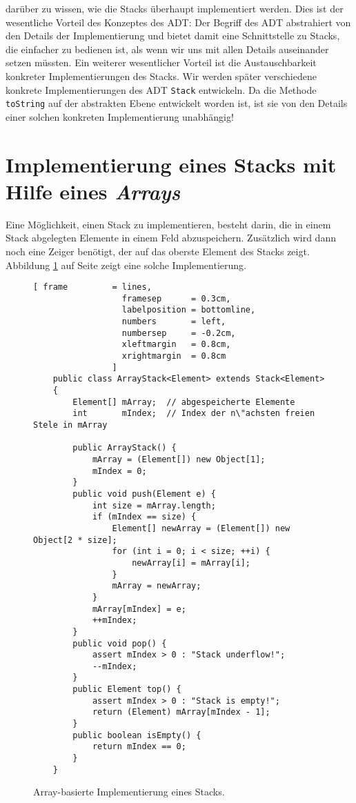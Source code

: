 dar\"uber zu wissen, wie die Stacks \"uberhaupt implementiert werden.  Dies ist der
wesentliche Vorteil des Konzeptes des ADT: Der Begriff des ADT abstrahiert von den Details der
Implementierung und bietet damit eine Schnittstelle zu Stacks, die einfacher zu bedienen
ist, als wenn wir uns mit allen Details auseinander setzen m\"ussten.  Ein weiterer
wesentlicher Vorteil ist die Austauschbarkeit konkreter Implementierungen des Stacks.  
Wir werden sp\"ater verschiedene konkrete
Implementierungen des ADT \texttt{Stack} entwickeln.  Da die Methode \texttt{toString} auf
der abstrakten Ebene entwickelt worden ist, ist sie von den Details einer solchen konkreten
Implementierung unabh\"angig!


\section{Implementierung eines Stacks mit Hilfe eines \emph{Arrays}}
Eine M\"oglichkeit, einen Stack zu implementieren, besteht darin,
die in einem Stack abgelegten Elemente in einem Feld abzuspeichern. 
Zus\"atzlich wird dann noch eine Zeiger ben\"otigt, der auf das oberste Element des Stacks 
zeigt. 
Abbildung \ref{fig:ArrayStack.java} auf Seite \pageref{fig:ArrayStack.java} zeigt eine solche
 Implementierung.

\begin{figure}[!h]
  \centering
\begin{Verbatim}[ frame         = lines, 
                  framesep      = 0.3cm, 
                  labelposition = bottomline,
                  numbers       = left,
                  numbersep     = -0.2cm,
                  xleftmargin   = 0.8cm,
                  xrightmargin  = 0.8cm
                ]
    public class ArrayStack<Element> extends Stack<Element>
    {
        Element[] mArray;  // abgespeicherte Elemente
        int       mIndex;  // Index der n\"achsten freien Stele in mArray
    
        public ArrayStack() {
            mArray = (Element[]) new Object[1];
            mIndex = 0;
        }        
        public void push(Element e) {
            int size = mArray.length;
            if (mIndex == size) {
                Element[] newArray = (Element[]) new Object[2 * size];
                for (int i = 0; i < size; ++i) {
                    newArray[i] = mArray[i];
                }
                mArray = newArray;
            }
            mArray[mIndex] = e;
            ++mIndex;
        }
        public void pop() {
            assert mIndex > 0 : "Stack underflow!";
            --mIndex;
        }    
        public Element top() {
            assert mIndex > 0 : "Stack is empty!";
            return (Element) mArray[mIndex - 1];
        }
        public boolean isEmpty() {
            return mIndex == 0;
        }
    }
\end{Verbatim}
\vspace*{-0.3cm}
  \caption{Array-basierte Implementierung eines Stacks.}
  \label{fig:ArrayStack.java}
\end{figure} 

